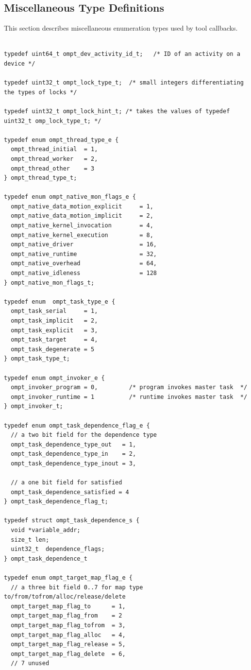 \documentclass{article}
\begin{document}
{\clearpage  
\subsection{Miscellaneous Type Definitions}
\label{appendix:ompt-types:misc}
This section describes miscellaneous enumeration types used by tool callbacks.

\begin{verbatim}

typedef uint64_t ompt_dev_activity_id_t;   /* ID of an activity on a device */

typedef uint32_t ompt_lock_type_t;  /* small integers differentiating the types of locks */

typedef uint32_t ompt_lock_hint_t; /* takes the values of typedef uint32_t omp_lock_type_t; */

typedef enum ompt_thread_type_e {
  ompt_thread_initial  = 1,
  ompt_thread_worker   = 2,
  ompt_thread_other    = 3
} ompt_thread_type_t;

typedef enum ompt_native_mon_flags_e {
  ompt_native_data_motion_explicit     = 1,
  ompt_native_data_motion_implicit     = 2,
  ompt_native_kernel_invocation        = 4,
  ompt_native_kernel_execution         = 8,
  ompt_native_driver                   = 16,
  ompt_native_runtime                  = 32,
  ompt_native_overhead                 = 64,
  ompt_native_idleness                 = 128
} ompt_native_mon_flags_t;

typedef enum  ompt_task_type_e {
  ompt_task_serial     = 1,
  ompt_task_implicit   = 2,
  ompt_task_explicit   = 3,
  ompt_task_target     = 4,
  ompt_task_degenerate = 5
} ompt_task_type_t;

typedef enum ompt_invoker_e {
  ompt_invoker_program = 0,         /* program invokes master task  */
  ompt_invoker_runtime = 1          /* runtime invokes master task  */
} ompt_invoker_t;

typedef enum ompt_task_dependence_flag_e {
  // a two bit field for the dependence type
  ompt_task_dependence_type_out   = 1,
  ompt_task_dependence_type_in    = 2,
  ompt_task_dependence_type_inout = 3,
  
  // a one bit field for satisfied
  ompt_task_dependence_satisfied = 4
} ompt_task_dependence_flag_t;

typedef struct ompt_task_dependence_s {
  void *variable_addr;
  size_t len;
  uint32_t  dependence_flags;
} ompt_task_dependence_t

typedef enum ompt_target_map_flag_e {
  // a three bit field 0..7 for map type to/from/tofrom/alloc/release/delete
  ompt_target_map_flag_to      = 1,
  ompt_target_map_flag_from    = 2
  ompt_target_map_flag_tofrom  = 3, 
  ompt_target_map_flag_alloc   = 4,
  ompt_target_map_flag_release = 5, 
  ompt_target_map_flag_delete  = 6, 
  // 7 unused


\end{verbatim}}
\end{document}
